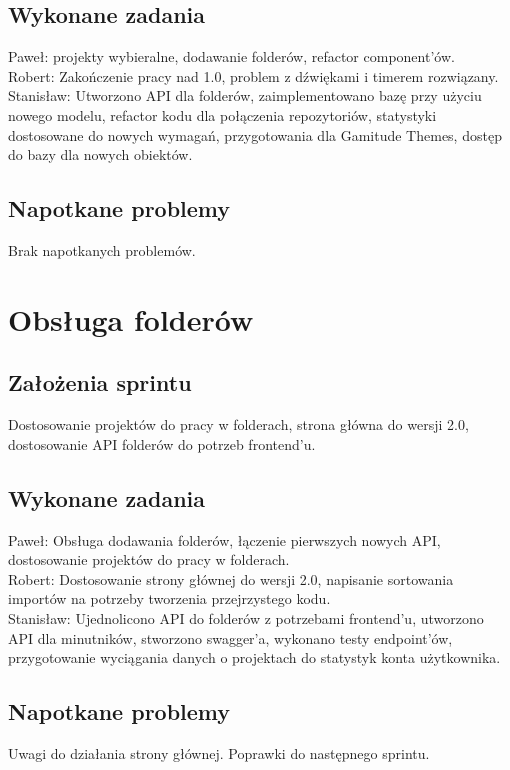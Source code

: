 \documentclass[a4paper,11pt]{report}
\begin{document}
\subsection {Wykonane zadania}
Paweł: projekty wybieralne, dodawanie folderów, refactor component'ów.\\ 
Robert: Zakończenie pracy nad 1.0, problem z dźwiękami i timerem rozwiązany.\\
Stanisław: Utworzono API dla folderów, zaimplementowano bazę przy użyciu nowego modelu, refactor kodu dla połączenia repozytoriów, statystyki dostosowane do nowych wymagań, przygotowania dla Gamitude Themes, dostęp do bazy dla nowych obiektów. \\
\subsection {Napotkane problemy}
Brak napotkanych problemów.

\section {Obsługa folderów}
\label{sec:system_zarzadzania_folderami_uzytkownikow}
\subsection {Założenia sprintu}
Dostosowanie projektów do pracy w folderach, strona główna do wersji 2.0, dostosowanie API folderów do potrzeb frontend'u.
\subsection {Wykonane zadania}
Paweł: Obsługa dodawania folderów, łączenie pierwszych nowych API, dostosowanie projektów do pracy w folderach.\\ 
Robert: Dostosowanie strony głównej do wersji 2.0, napisanie sortowania importów na potrzeby tworzenia przejrzystego kodu.\\
Stanisław: Ujednolicono API do folderów z potrzebami frontend'u, utworzono API dla minutników, stworzono swagger'a, wykonano testy endpoint'ów, przygotowanie wyciągania danych o projektach do statystyk konta użytkownika.\\  
\subsection {Napotkane problemy}
Uwagi do działania strony głównej. Poprawki do następnego sprintu.
\end{document}
